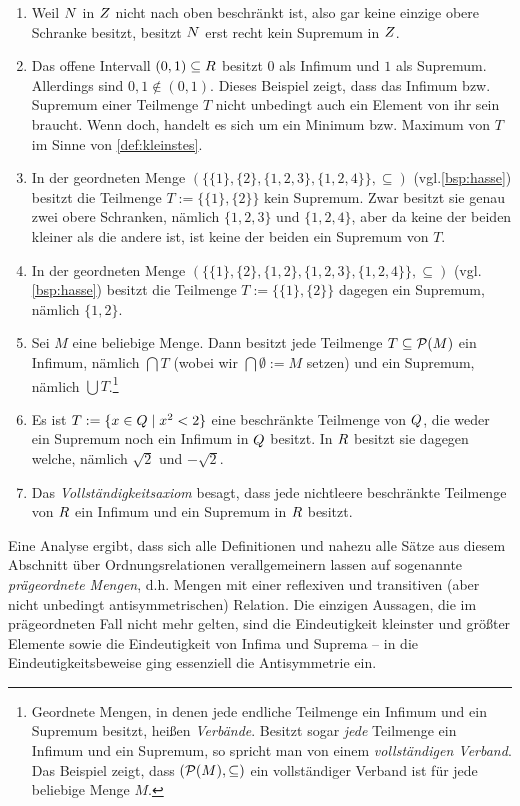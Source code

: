 \begin{bsp} \quad
    \begin{enumerate}
        \item Weil $\relax N$ in $\relax Z$ nicht nach oben beschränkt ist, also gar keine einzige obere Schranke besitzt, besitzt $\relax N$ erst recht kein Supremum in $\relax Z$.
        \item Das offene Intervall $(0,1)\subseteq \relax R$ besitzt $0$ als Infimum und $1$ als Supremum. Allerdings sind $0,1\notin (0,1)$. Dieses Beispiel zeigt, dass das Infimum bzw. Supremum einer Teilmenge $T$ nicht unbedingt auch ein Element von ihr sein braucht. Wenn doch, handelt es sich um ein Minimum bzw. Maximum von $T$ im Sinne von \cref{def:kleinstes}.
        \item In der geordneten Menge $(\{\{1\},\{2\},\{1,2,3\},\{1,2,4\}\},\subseteq)$ (vgl.\cref{bsp:hasse}) besitzt die Teilmenge $T:=\{\{1\},\{2\}\}$ kein Supremum. Zwar besitzt sie genau zwei obere Schranken, nämlich $\{1,2,3\}$ und $\{1,2,4\}$, aber da keine der beiden kleiner als die andere ist, ist keine der beiden ein Supremum von $T$.
        \item In der geordneten Menge $(\{\{1\},\{2\},\{1,2\},\{1,2,3\},\{1,2,4\}\},\subseteq)$ (vgl. \cref{bsp:hasse}) besitzt die Teilmenge $T:=\{\{1\},\{2\}\}$ dagegen ein Supremum, nämlich $\{1,2\}$.
        \item Sei $M$ eine beliebige Menge. Dann besitzt jede Teilmenge $T\subseteq \mathcal P(M)$ ein Infimum, nämlich $\bigcap T$ (wobei wir $\bigcap \emptyset:=M$ setzen) und ein Supremum, nämlich $\bigcup T$.\footnote{Geordnete Mengen, in denen jede endliche Teilmenge ein Infimum und ein Supremum besitzt, heißen \emph{Verbände}. Besitzt sogar \emph{jede} Teilmenge ein Infimum und ein Supremum, so spricht man von einem \emph{vollständigen Verband}. Das Beispiel zeigt, dass $(\mathcal P(M),\subseteq)$ ein vollständiger Verband ist für jede beliebige Menge $M$.}
        \item Es ist $T:=\{x\in \relax Q \mid x^2 < 2\}$ eine beschränkte Teilmenge von $\relax Q$, die weder ein Supremum noch ein Infimum in $\relax Q$ besitzt. In $\relax R$ besitzt sie dagegen welche, nämlich $\sqrt{2}$ und $-\sqrt{2}$.
        \item Das \emph{Vollständigkeitsaxiom} besagt, dass jede nichtleere beschränkte Teilmenge von $\relax R$ ein Infimum und ein Supremum in $\relax R$ besitzt.
    \end{enumerate}
\end{bsp}


\begin{bem}
    Eine Analyse ergibt, dass sich alle Definitionen und nahezu alle Sätze aus diesem Abschnitt über Ordnungsrelationen verallgemeinern lassen auf sogenannte \emph{prägeordnete Mengen}, d.h. Mengen mit einer reflexiven und transitiven (aber nicht unbedingt antisymmetrischen) Relation. Die einzigen Aussagen, die im prägeordneten Fall nicht mehr gelten, sind die Eindeutigkeit kleinster und größter Elemente sowie die Eindeutigkeit von Infima und Suprema -- in die Eindeutigkeitsbeweise ging essenziell die Antisymmetrie ein.
\end{bem}


